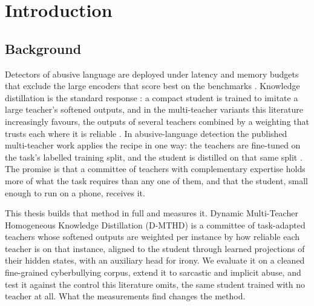
\chapter{Introduction}
\label{ch:1}

\section{Background}
\label{sec:1.1}
Detectors of abusive language are deployed under latency and memory budgets that exclude the large
encoders that score best on the benchmarks \cite{schwartz2020green, patterson2021carbon,
zhou2019edge}. Knowledge distillation is the standard response \cite{hinton2015distilling,
bucilua2006model}: a compact student is trained to imitate a large teacher's softened outputs, and
in the multi-teacher variants this literature increasingly favours, the outputs of several teachers
combined by a weighting that trusts each where it is reliable \cite{you2017learning, wu2021one,
zhang2022confidence, yuan2021reinforced}. In abusive-language detection the published multi-teacher
work applies the recipe in one way: the teachers are fine-tuned on the task's labelled training
split, and the student is distilled on that same split \cite{wu2021one, prasomphan2025mtkd}. The
promise is that a committee of teachers with complementary expertise holds more of what the task
requires than any one of them, and that the student, small enough to run on a phone, receives it.

This thesis builds that method in full and measures it. Dynamic Multi-Teacher Homogeneous Knowledge
Distillation (D-MTHD) is a committee of task-adapted teachers whose softened outputs are weighted per
instance by how reliable each teacher is on that instance, aligned to the student through learned
projections of their hidden states, with an auxiliary head for irony. We evaluate it on a cleaned
fine-grained cyberbullying corpus, extend it to sarcastic and implicit abuse, and test it against the
control this literature omits, the same student trained with no teacher at all. What the measurements
find changes the method.

